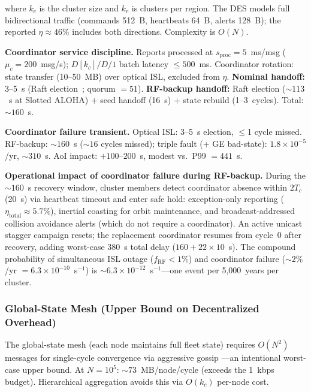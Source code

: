 \documentclass[journal]{IEEEtran}
\begin{document}
\noindent where $k_c$ is the cluster size and $k_r$ is clusters per region. The DES models full bidirectional traffic (commands 512~B, heartbeats 64~B, alerts 128~B); the reported $\eta \approx 46\%$ includes both directions. Complexity is $O(N)$.

\textbf{Coordinator service discipline.} Reports processed at $s_{\text{proc}} = 5$~ms/msg ($\mu_c = 200$~msg/s); $D[k_c]/D/1$ batch latency $\leq 500$~ms. Coordinator rotation: state transfer (10--50~MB) over optical ISL, excluded from $\eta$. \textbf{Nominal handoff:} 3--5~s (Raft election~\cite{ongaro_raft}; quorum $= 51$). \textbf{RF-backup handoff:} Raft election (${\sim}113$~s at Slotted ALOHA) $+$ seed handoff (16~s) $+$ state rebuild (1--3~cycles). Total: ${\sim}160$~s.

\textbf{Coordinator failure transient.}
\label{sec:coord_failure_transient}
Optical ISL: 3--5~s election, $\leq$1 cycle missed. RF-backup: ${\sim}160$~s (${\sim}16$ cycles missed); triple fault (+ GE bad-state): $1.8 \times 10^{-5}$/yr, ${\sim}310$~s. AoI impact: $+100$--$200$~s, modest vs.\ P99 $= 441$~s.

\textbf{Operational impact of coordinator failure during RF-backup.} During the ${\sim}160$~s recovery window, cluster members detect coordinator absence within $2T_c$ (20~s) via heartbeat timeout and enter safe hold: exception-only reporting ($\eta_{\text{total}} \approx 5.7\%$), inertial coasting for orbit maintenance, and broadcast-addressed collision avoidance alerts (which do not require a coordinator). An active unicast stagger campaign resets; the replacement coordinator resumes from cycle~0 after recovery, adding worst-case 380~s total delay ($160 + 22 \times 10$~s). The compound probability of simultaneous ISL outage ($f_{\text{RF}} < 1\%$) and coordinator failure (${\sim}2\%$/yr $= 6.3 \times 10^{-10}$~s$^{-1}$) is ${\sim}6.3 \times 10^{-12}$~s$^{-1}$---one event per 5{,}000~years per cluster.

\subsubsection{Global-State Mesh (Upper Bound on Decentralized Overhead)}

The global-state mesh (each node maintains full fleet state) requires $O(N^2)$ messages for single-cycle convergence via aggressive gossip \cite{demers_gossip}---an intentional worst-case upper bound. At $N = 10^5$: ${\sim}73$~MB/node/cycle (exceeds the 1~kbps budget). Hierarchical aggregation avoids this via $O(k_c)$ per-node cost.
\end{document}
